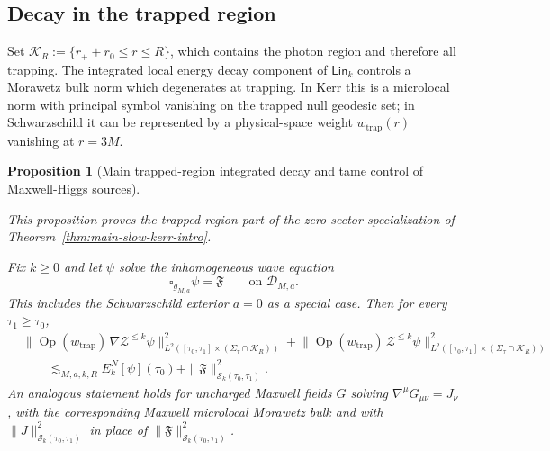 \documentclass[11pt]{article}
\numberwithin{equation}{section}
\theoremstyle{plain}
\newtheorem{proposition}[theorem]{Proposition}
\theoremstyle{definition}
\theoremstyle{remark}
\newcommand{\Lin}{\mathsf{Lin}}
\begin{document}
\subsection{Decay in the trapped region}\label{subsec:kerr-trapped-decay}

Set $\mathcal K_{R}:=\{r_{+}+r_{0}\le r\le R\}$, which contains the photon region and therefore all trapping.
The integrated local energy decay component of $\Lin_{k}$ controls a Morawetz bulk norm which degenerates at trapping. In Kerr this is a microlocal norm with principal symbol vanishing on the trapped null geodesic set; in Schwarzschild it can be represented by a physical-space weight $w_{\mathrm{trap}}(r)$ vanishing at $r=3M$.


\begin{proposition}[Main trapped-region integrated decay and tame control of Maxwell-Higgs sources]\label{prop:kerr-trapped-iled}

\noindent\emph{This proposition proves the trapped-region part of the zero-sector specialization of Theorem~\ref{thm:main-slow-kerr-intro}.}

Fix $k\ge0$ and let $\psi$ solve the inhomogeneous wave equation
\begin{equation}
\square_{g_{M,a}}\psi=\mathfrak{F}
\qquad\text{on }\mathcal D_{M,a}.
\end{equation}
This includes the Schwarzschild exterior $a=0$ as a special case.
Then for every $\tau_{1}\ge\tau_{0}$,
\begin{eqnarray}\label{eq:kerr-trapped-iled}
&\bigl\|\operatorname{Op}(w_{\mathrm{trap}})\,\nabla\mathcal Z^{\le k}\psi\bigr\|_{L^{2}([\tau_0,\tau_1]\times(\Sigma_\tau\cap\mathcal K_R))}^{2}
+\bigl\|\operatorname{Op}(w_{\mathrm{trap}})\,\mathcal Z^{\le k}\psi\bigr\|_{L^{2}([\tau_0,\tau_1]\times(\Sigma_\tau\cap\mathcal K_R))}^{2}
\\
&\qquad\lesssim_{M,a,k,R}
E^{N}_{k}[\psi](\tau_{0})
+
\|\mathfrak{F}\|_{\mathcal S_{k}(\tau_{0},\tau_{1})}^{2}.
\end{eqnarray}
An analogous statement holds for uncharged Maxwell fields $G$ solving $\nabla^{\mu}G_{\mu\nu}=J_{\nu}$,
with the corresponding Maxwell microlocal Morawetz bulk and with $\|J\|_{\mathcal S_{k}(\tau_{0},\tau_{1})}^{2}$ in place of $\|\mathfrak{F}\|_{\mathcal S_{k}(\tau_{0},\tau_{1})}^{2}$.


\end{proposition}
\end{document}
